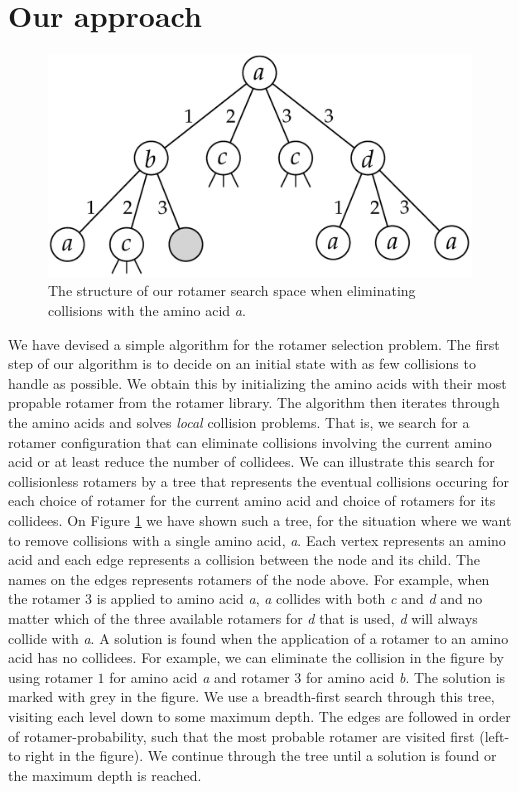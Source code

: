 \section{Our approach}
\begin{figure}
    \centering
    \includegraphics[width=.9\columnwidth]{figures/rotamersearch}
    \caption{The structure of our rotamer search space when eliminating
      collisions with the amino acid \textit{a}.}
    \label{fig:rotamer-search-tree}
\end{figure}
We have devised a simple algorithm for the rotamer selection problem.
The first step of our algorithm is to decide on an initial state with
as few collisions to handle as possible. We obtain this by
initializing the amino acids with their most propable rotamer from the
rotamer library. The algorithm then iterates through the amino acids
and solves \textit{local} collision problems. That is, we search for a
rotamer configuration that can eliminate collisions involving the
current amino acid or at least reduce the number of collidees. We can
illustrate this search for collisionless rotamers by a tree that
represents the eventual collisions occuring for each choice of rotamer
for the current amino acid and choice of rotamers for its
collidees. On Figure
\ref{fig:rotamer-search-tree} we have shown such a tree, for the
situation where we want to remove collisions with a single amino acid,
\textit{a}. Each vertex represents an amino acid and each edge
represents a collision between the node and its child. The names on
the edges represents rotamers of the node above. For example, when the
rotamer $3$ is applied to amino acid \textit{a}, \textit{a} collides
with both \textit{c} and \textit{d} and no matter which of the three
available rotamers for \textit{d} that is used, \textit{d} will always
collide with \textit{a}. A solution is found when the application of a
rotamer to an amino acid has no collidees. For example, we can
eliminate the collision in the figure by using rotamer $1$ for amino
acid \textit{a} and rotamer $3$ for amino acid
\textit{b}. The solution is marked with grey in the figure.
We use a breadth-first search through this tree, visiting
each level down to some maximum depth. The edges are followed in order
of rotamer-probability, such that the most probable rotamer are
visited first (left-to right in the figure). We continue through the
tree until a solution is found or the maximum depth is reached.

